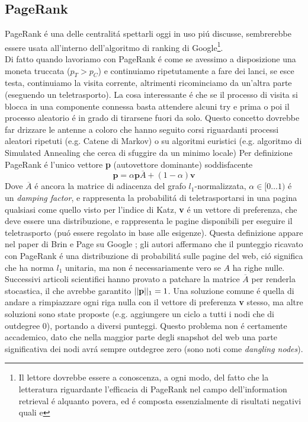\subsection{PageRank}
PageRank é una delle centralitá spettarli oggi in uso piú discusse, sembrerebbe essere usata all'interno dell'algoritmo di ranking di Google\footnote{Il lettore dovrebbe essere a conoscenza, a ogni modo, del fatto che la letteratura riguardante l'efficacia di PageRank nel campo dell'information retrieval é alquanto povera, ed é composta essenzialmente di risultati negativi quali %
e
}.\\
Di fatto quando lavoriamo con PageRank é come se avessimo a disposizione una moneta truccata ($p_T > p_C$) e continuiamo ripetutamente a fare dei lanci, se esce testa, continuiamo la visita corrente, altrimenti ricominciamo da un'altra parte (eseguendo un teletrasporto). La cosa interessante é che se il processo di visita si blocca in una componente connessa basta attendere alcuni try e prima o poi il processo aleatorio é in grado di tirarsene fuori da solo. Questo concetto dovrebbe far drizzare le antenne a coloro che hanno seguito corsi riguardanti processi aleatori ripetuti (e.g. Catene di Markov) o su algoritmi euristici (e.g. algoritmo di Simulated Annealing che cerca di sfuggire da un minimo locale)
Per definizione PageRank é l'unico vettore \textbf{p} (autovettore dominante) soddisfacente
\begin{equation}
    \textbf{p} = \alpha\textbf{p}\overline{A} + (1 - \alpha)\textbf{v}
\end{equation}
Dove $\overline{A}$ é ancora la matrice di adiacenza del grafo $l_1$-normalizzata, $\alpha \in [0\dots1)$ é un \textit{damping factor}, e rappresenta la probabilitá di teletrasportarsi in una pagina qualsiasi come quello visto per l'indice di Katz, \textbf{v} é un vettore di preferenza, che deve essere una distribuzione, e rappresenta le pagine disponibili per eseguire il teletrasporto (puó essere regolato in base alle esigenze). Questa definizione appare nel paper di Brin e Page su Google %
; gli autori affermano che il punteggio ricavato con PageRank é una distribuzione di probabilitá sulle pagine del web, ció significa che ha norma $l_1$ unitaria, ma non é necessariamente vero se $A$ ha righe nulle. Successivi articoli scientifici hanno provato a patchare la matrice $\overline{A}$ per renderla stocastica, il che avrebbe garantito $\lvert\lvert \textbf{p} \rvert\rvert_1 = 1$. Una soluzione comune é quella di andare a rimpiazzare ogni riga nulla con il vettore di preferenza \textbf{v} stesso, ma altre soluzioni sono state proposte (e.g. aggiungere un ciclo a tutti i nodi che di outdegree 0), portando a diversi punteggi. Questo problema non é certamente accademico, dato che nella maggior parte degli snapshot del web una parte significativa dei nodi avrá sempre outdegree zero (sono noti come \textit{dangling nodes}).\\
